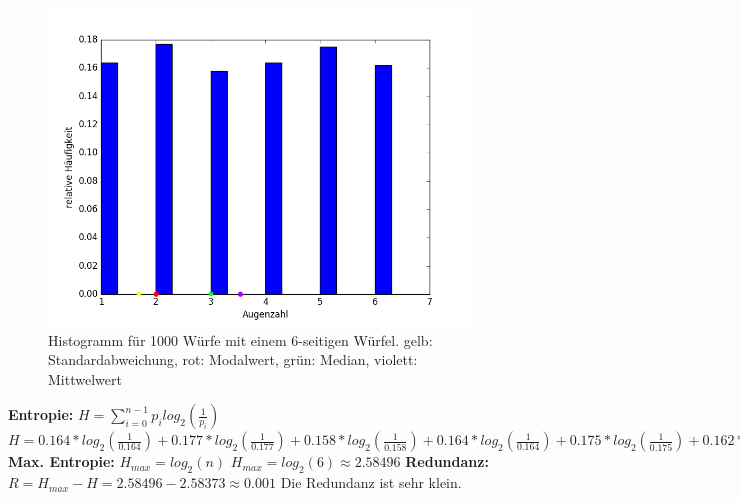 	\begin{figure}
		\includegraphics[width=1.0\textwidth]{A03_histo.png}
		\caption{Histogramm für 1000 Würfe mit einem 6-seitigen Würfel. \newline gelb: Standardabweichung, rot: Modalwert, grün: Median, violett: Mittwelwert}
	\end{figure}
	\textbf{Entropie:} \newline
	$H = \sum_{i=0}^{n-1} p_i log_2(\frac{1}{p_i})$ \newline
	$H = 0.164*log_2(\frac{1}{0.164}) + 0.177*log_2(\frac{1}{0.177}) + 0.158*log_2(\frac{1}{0.158}) + 0.164*log_2(\frac{1}{0.164}) + 0.175*log_2(\frac{1}{0.175}) + 0.162*log_2(\frac{1}{0.162}) \approx 2.58373$ \newline
	\textbf{Max. Entropie:} \newline
	$H_{max} = log_2(n)$ \newline
	$H_{max} = log_2(6) \approx 2.58496$ \newline
	\textbf{Redundanz:} \newline
	$R = H_{max} - H = 2.58496 - 2.58373 \approx 0.001$ \newline
	Die Redundanz ist sehr klein.
